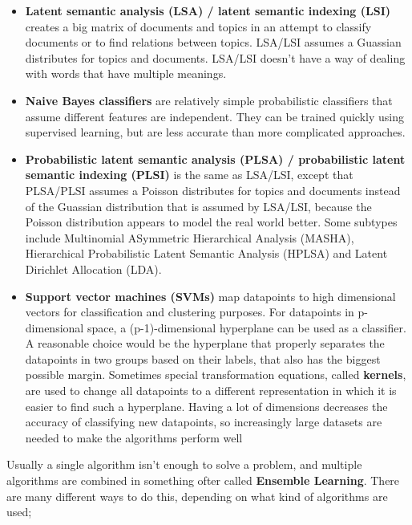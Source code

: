 \begin{itemize}
	\item \textbf{Latent semantic analysis (LSA) / latent semantic indexing (LSI)}
		creates a big matrix of documents and topics in an attempt to classify documents or to find relations between topics. LSA/LSI assumes a Guassian distributes for topics and documents. LSA/LSI doesn't have a way of dealing with words that have multiple meanings.
	\item \textbf{Naive Bayes classifiers}
		are relatively simple probabilistic classifiers that assume different features are independent. They can be trained quickly using supervised learning, but are less accurate than more complicated approaches.
	\item \textbf{Probabilistic latent semantic analysis (PLSA) / probabilistic latent semantic indexing (PLSI)}
		is the same as LSA/LSI, except that PLSA/PLSI assumes a Poisson distributes for topics and documents instead of the Guassian distribution that is assumed by LSA/LSI, because the Poisson distribution appears to model the real world better. Some subtypes include Multinomial ASymmetric Hierarchical Analysis (MASHA), Hierarchical Probabilistic Latent Semantic Analysis (HPLSA) and Latent Dirichlet Allocation (LDA).
	\item \textbf{Support vector machines (SVMs)}
		map datapoints to high dimensional vectors for classification and clustering purposes. For datapoints in p-dimensional space, a (p-1)-dimensional hyperplane can be used as a classifier. A reasonable choice would be the hyperplane that properly separates the datapoints in two groups based on their labels, that also has the biggest possible margin. Sometimes special transformation equations, called \textbf{kernels}, are used to change all datapoints to a different representation in which it is easier to find such a hyperplane.
		Having a lot of dimensions decreases the accuracy of classifying new datapoints, so increasingly large datasets are needed to make the algorithms perform well
\end{itemize}

Usually a single algorithm isn't enough to solve a problem, and multiple algorithms are combined in something ofter called \textbf{Ensemble Learning}. There are many different ways to do this, depending on what kind of algorithms are used;

